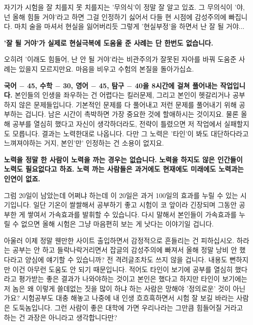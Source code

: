 자기가 시험을 잘 치를지 못 치를지는 '무의식'이 정말 잘 알고 있죠.
그 무의식이 '야, 넌 올해 힘들 거야'라고 하면 그걸 인정하기 싫어서 다들 현 시점에 감성주의에 빠집니다.
마치 술을 마셔서 현실을 잃어버리듯 그렇게 '현실부정'을 하면서 난 잘 될 거야...
\vspace{5mm}

\textbf{'잘 될 거야'가 실제로 현실극복에 도움울 준 사례는 단 한번도 없습니다.}
\vspace{5mm}

오히려 '이래도 힘들어, 난 안 될 거야'라는 비관주의가 잘못된 자아를 바꿔 도움준 사례는 있을지 모르지만요.
마음을 비우고 수험의 본질을 돌아가십쇼.
\vspace{5mm}

\textbf{국어 $-$ 45, 수학 $-$ 30, 영어 $-$ 45, 탐구 $-$ 40을 8시간에 걸쳐 풀어내는 작업입니다.}
본인들의 인생을 좌우하는 건 어렵다는 킬러문제, 그리고 본인이 헷갈리거나 공부하지 않은 문제들입니다.
기본적인 문제를 다 풀어내고 저런 문제를 풀어내기 위해 공부하는 겁니다. 남은 시간이 촉박하면 가장 중요한 것에 할애하시는 것이지요.
물론 올해 공부를 열심히 했다고 자신이 생각하더라도, 전략이 틀렸으면 저 작업에서 실패할지도 모릅니다.
결과는 노력한대로 나옵니다. 다만 그 노력은 '타인'이 봐도 대단하다라고 느껴져야하는 거지, 본인'만' 인정하는 건 소용이 없지요.
\vspace{5mm}

\textbf{노력을 정말 한 사람이 노력을 까는 경우는 없습니다.}
\textbf{노력을 하지도 않은 인간들이 노력도 필요없다고 하죠.}
\textbf{노력 까는 사람들은 과거에도 현재에도 미래에도 노력과는 인연이 없죠.}
\vspace{5mm}

그럼 20일이 남았는데 어쩌냐 하는데
이 20일은 과거 100일의 효과를 누릴 수 있는 시기입니다.
일단 기온이 쌀쌀해서 공부하기 좋고 시험이 코 앞이라 긴장되며 그동안 공부한 게 쌓여서 가속효과를 발휘할 수 있습니다.
다시 말해서 본인들이 가속효과를 누릴 수 없으면 올해 시험은 그냥 마음편히 보는 게 낫다는 이야기일 겁니다.
\vspace{5mm}

아울러 이제 정말 웬만한 사이트 출입하면서 감정적으로 흔들리는 건 피하십시오.
하라는 공부는 안 하고 들락나락거리면서 잡글의 감성주의에 빠져서 올해 정말 낭비 안 했다라고 양심에 얘기할 수 있습니까?
전 격려글조차도 쓰지 않을 겁니다. 내용도 뻔하지만 이건 아무런 도움도 안 되기 때문입니다.
적어도 타인이 보기에 공부를 열심히 했다라고  평가받는 좋은 결과가 나와야하는 것이고
본인은 했다고 하지만 타인이 보기에는 저 놈은 왜 이렇게 쓸데없는 짓을 많이 하냐 하는 사람은 망해야 '정의로운' 것이 아닌가요?
시험공부도 대충 해놓고 나중에 내 인생 흐흐흑하면서 시험 잘 보길 바라는 사람은 도둑놈입니다.
그런 사람이 좋은 대학에 가면 우리나라는 그만큼 힘들어질 거라고 하는 건 과장은 아니라고 생각합니다만?
\vspace{5mm}

